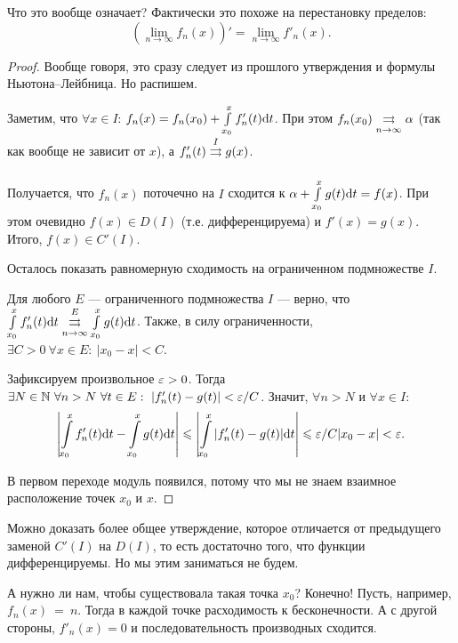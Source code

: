 \documentclass[a4paper, 12pt]{article}
\begin{document}
Что это вообще означает? Фактически это похоже на перестановку пределов:
$$
(\lim\limits_{n \to \infty} f_n(x))' = \lim\limits_{n \to \infty} f'_n(x). 
$$

\begin{proof}
Вообще говоря, это сразу следует из прошлого утверждения и формулы Ньютона--Лейбница. Но распишем.

Заметим, что $\forall x \in I$: $f_n(x) = f_n(x_0) + \int\limits_{x_0}^x f'_n(t) \mathrm{d} t$. При этом $f_n(x_0) \overset{}{\underset{n \to \infty}{\rightrightarrows}} \alpha$ (так как вообще не зависит от $x$), а $f'_n(t) \overset{I}{\underset{}{\rightrightarrows}} g(x)$.

Получается, что $f_n(x)$ поточечно на $I$ сходится к $\alpha + \int\limits_{x_0}^x g(t)\mathrm{d} t = f(x)$. При этом очевидно $f(x) \in D(I)$ (т.е. дифференцируема) и $f'(x) = g(x)$. Итого, $f(x) \in C'(I)$.

Осталось показать равномерную сходимость на ограниченном подмножестве $I$.

Для любого $E$ --- ограниченного подмножества $I$ --- верно, что $\int\limits_{x_0}^xf'_n(t) \mathrm{d} t \overset{E}{\underset{n \to \infty}{\rightrightarrows}} \int\limits_{x_0}^x g(t) \mathrm{d} t$. Также, в силу ограниченности, $\exists C > 0\ \forall x \in E: \ |x_0 - x| < C$.

Зафиксируем произвольное $\varepsilon > 0$. Тогда $\exists N \in \mathbb{N}\ \forall n > N\ \forall t \in E:\ |f'_n(t) - g(t)| < \varepsilon/C$. Значит, $\forall n > N$ и $\forall x \in I$:
\begin{gather}
\left| \int\limits_{x_0}^x f'_n(t) \mathrm{d} t - \int\limits_{x_0}^x g(t) \mathrm{d} t \right| \leqslant \left| \int\limits_{x_0}^x |f'_n(t) - g(t)| \mathrm{d} t \right| \leqslant \varepsilon/C |x_0 - x| < \varepsilon.
\end{gather}

В первом переходе модуль появился, потому что мы не знаем взаимное расположение точек $x_0$ и $x$.
\end{proof}

Можно доказать более общее утверждение, которое отличается от предыдущего заменой $C'(I)$ на $D(I)$, то есть достаточно того, что функции дифференцируемы. Но мы этим заниматься не будем.

А нужно ли нам, чтобы существовала такая точка $x_0$? Конечно! Пусть, например, $f_n(x)~=~n$. Тогда в каждой точке расходимость к бесконечности. А с другой стороны, $f'_n(x) = 0$ и последовательность производных сходится.
\end{document}
